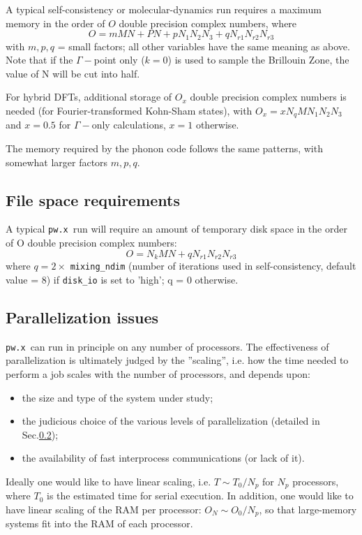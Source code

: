 \documentclass[12pt,a4paper]{article}
\def\pwx{\texttt{pw.x}}
\begin{document}
A typical self-consistency or molecular-dynamics run requires a maximum
memory in the order of $O$ double precision complex numbers, where
$$ O = m M N + P N + p N_1 N_2 N_3 + q N_{r1} N_{r2} N_{r3}$$
with $m, p, q$ = small factors; all other variables have the same meaning as
above. Note that if the $\Gamma-$point only ($k=0$) is used to sample the 
Brillouin Zone, the value of N will be cut into half.

For hybrid DFTs, additional storage of $O_x$ double precision complex 
numbers is needed (for Fourier-transformed Kohn-Sham states), with
$O_x = x N_q M N_1N_2N_3$ and $x=0.5$ for $\Gamma-$only 
calculations, $x=1$ otherwise.

The memory required by the phonon code follows the same patterns, with
somewhat larger factors $m, p, q$.

\subsection{File space requirements}

A typical \pwx\ run will require an amount of temporary disk space in the
order of O double precision complex numbers:
$$O = N_k M N + q N_{r1} N_{r2}N_{r3}$$
where $q = 2\times$ \texttt{mixing\_ndim} (number of iterations used in 
self-consistency, default value = 8) if \texttt{disk\_io} is set to 'high'; q = 0 
otherwise.

\subsection{Parallelization issues}
\label{SubSec:badpara}

\pwx\ can run in principle on any number of processors.
The effectiveness of parallelization is ultimately judged by the 
''scaling'', i.e. how the time needed to perform a job scales
 with the number of processors, and depends upon:
\begin{itemize}
\item the size and type of the system under study;
\item the judicious choice of the various levels of parallelization 
(detailed in Sec.\ref{SubSec:badpara});
\item the availability of fast interprocess communications (or lack of it).
\end{itemize}
Ideally one would like to have linear scaling, i.e. $T \sim T_0/N_p$ for 
$N_p$ processors, where $T_0$ is the estimated time for serial execution.
 In addition, one would like to have linear scaling of
the RAM per processor: $O_N \sim O_0/N_p$, so that large-memory systems
fit into the RAM of each processor.
\end{document}
